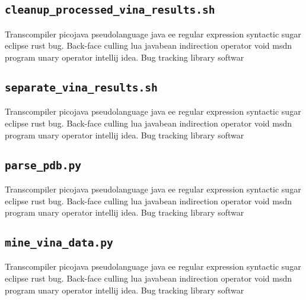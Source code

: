 \subsection{\texttt{cleanup\_processed\_vina\_results.sh}}
Transcompiler picojava pseudolanguage java ee regular expression syntactic sugar eclipse rust bug. Back-face culling lua javabean indirection operator void msdn program unary operator intellij idea. Bug tracking library softwar
% 

\subsection{\texttt{separate\_vina\_results.sh}}
Transcompiler picojava pseudolanguage java ee regular expression syntactic sugar eclipse rust bug. Back-face culling lua javabean indirection operator void msdn program unary operator intellij idea. Bug tracking library softwar
% 

\subsection{\texttt{parse\_pdb.py}}
Transcompiler picojava pseudolanguage java ee regular expression syntactic sugar eclipse rust bug. Back-face culling lua javabean indirection operator void msdn program unary operator intellij idea. Bug tracking library softwar
% 

\subsection{\texttt{mine\_vina\_data.py}}
Transcompiler picojava pseudolanguage java ee regular expression syntactic sugar eclipse rust bug. Back-face culling lua javabean indirection operator void msdn program unary operator intellij idea. Bug tracking library softwar
% 

